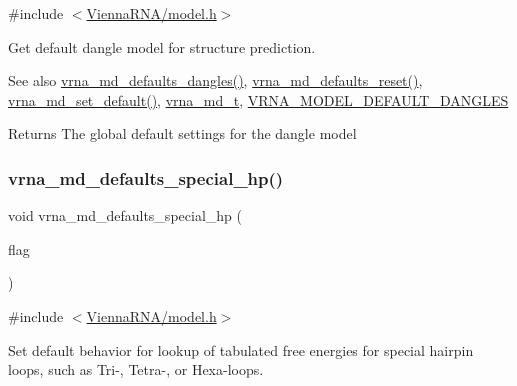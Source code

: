 {\ttfamily \#include $<$\mbox{\hyperlink{model_8h}{Vienna\+R\+N\+A/model.\+h}}$>$}



Get default dangle model for structure prediction. 

\begin{DoxySeeAlso}{See also}
\mbox{\hyperlink{group__model__details_gac76a5374def8e5e4e644ff6e4cc72dee}{vrna\+\_\+md\+\_\+defaults\+\_\+dangles()}}, \mbox{\hyperlink{group__model__details_ga70834424cf804d149937de89f80ceb45}{vrna\+\_\+md\+\_\+defaults\+\_\+reset()}}, \mbox{\hyperlink{group__model__details_ga8ac6ff84936282436f822644bf841f66}{vrna\+\_\+md\+\_\+set\+\_\+default()}}, \mbox{\hyperlink{group__model__details_ga1f8a10e12a0a1915f2a4eff0b28ea17c}{vrna\+\_\+md\+\_\+t}}, \mbox{\hyperlink{group__model__details_ga2aa7bc2cae774b83a5c468f824c27a42}{V\+R\+N\+A\+\_\+\+M\+O\+D\+E\+L\+\_\+\+D\+E\+F\+A\+U\+L\+T\+\_\+\+D\+A\+N\+G\+L\+ES}} 
\end{DoxySeeAlso}
\begin{DoxyReturn}{Returns}
The global default settings for the dangle model 
\end{DoxyReturn}
\mbox{\label{group__model__details_gafff6449a02744add0308e653230c15fc}} 
\subsubsection{\texorpdfstring{vrna\+\_\+md\+\_\+defaults\+\_\+special\+\_\+hp()}{vrna\_md\_defaults\_special\_hp()}}
{\footnotesize\ttfamily void vrna\+\_\+md\+\_\+defaults\+\_\+special\+\_\+hp (\begin{DoxyParamCaption}\item[{int}]{flag }\end{DoxyParamCaption})}



{\ttfamily \#include $<$\mbox{\hyperlink{model_8h}{Vienna\+R\+N\+A/model.\+h}}$>$}



Set default behavior for lookup of tabulated free energies for special hairpin loops, such as Tri-\/, Tetra-\/, or Hexa-\/loops. 

